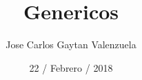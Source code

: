 \documentclass{article}
\begin{document}
    
    \title{Genericos}
    \author{Jose Carlos Gaytan Valenzuela}
    \date{ 22 / Febrero / 2018 }
   
\end{document}
